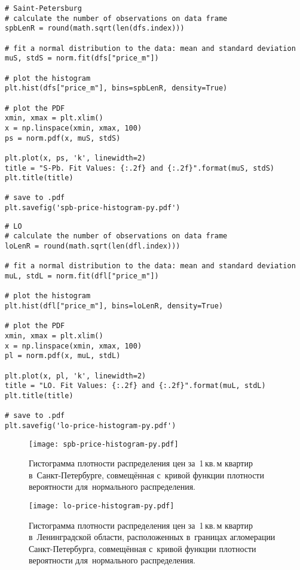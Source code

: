 \documentclass[]{scrreprt}
\begin{document}
%
\begin{lstlisting}[float, caption = Построение гистограммы для~Санкт-Петербурга, firstnumber=1, label= lst:price-hist-spb]
# Saint-Petersburg
# calculate the number of observations on data frame
spbLenR = round(math.sqrt(len(dfs.index)))

# fit a normal distribution to the data: mean and standard deviation
muS, stdS = norm.fit(dfs["price_m"])

# plot the histogram
plt.hist(dfs["price_m"], bins=spbLenR, density=True)

# plot the PDF
xmin, xmax = plt.xlim()
x = np.linspace(xmin, xmax, 100)
ps = norm.pdf(x, muS, stdS)

plt.plot(x, ps, 'k', linewidth=2)
title = "S-Pb. Fit Values: {:.2f} and {:.2f}".format(muS, stdS)
plt.title(title)

# save to .pdf
plt.savefig('spb-price-histogram-py.pdf')
\end{lstlisting}
%
\begin{lstlisting}[float, caption = Построение гистограммы для~Ленингадской области, firstnumber=1, label= lst:price-hist-lo]
# LO
# calculate the number of observations on data frame
loLenR = round(math.sqrt(len(dfl.index)))

# fit a normal distribution to the data: mean and standard deviation
muL, stdL = norm.fit(dfl["price_m"])

# plot the histogram
plt.hist(dfl["price_m"], bins=loLenR, density=True)

# plot the PDF
xmin, xmax = plt.xlim()
x = np.linspace(xmin, xmax, 100)
pl = norm.pdf(x, muL, stdL)

plt.plot(x, pl, 'k', linewidth=2)
title = "LO. Fit Values: {:.2f} and {:.2f}".format(muL, stdL)
plt.title(title)

# save to .pdf
plt.savefig('lo-price-histogram-py.pdf')
\end{lstlisting} 
%
\begin{figure}[ht]
	\centering
	\texttt{[image: spb-price-histogram-py.pdf]}
	\caption{Гистограмма плотности распределения цен за~1\,кв.\,м квартир в~Санкт-Петербурге, совмещённая с~кривой функции плотности вероятности для~нормального распределения.}
	\label{fig:spb-prices-hist}
\end{figure}
%
\begin{figure}[ht]
	\centering
	\texttt{[image: lo-price-histogram-py.pdf]}
	\caption{Гистограмма плотности распределения цен за~1\,кв.\,м квартир в~Ленинградской области, расположенных в~границах агломерации Санкт-Петербурга, совмещённая с~кривой функции плотности вероятности для~нормального распределения.}
	\label{fig:lo-prices-hist}
\end{figure}
%
\end{document}
